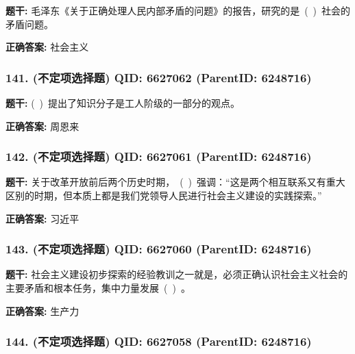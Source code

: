 \documentclass[12pt,UTF8]{ctexart}
\begin{document}
\textbf{题干:}
毛泽东《关于正确处理人民内部矛盾的问题》的报告，研究的是 ( ) 社会的矛盾问题。



\textbf{正确答案:}
社会主义

\vspace{0.3em}\hrulefill\vspace{0.7em}

\subsubsection*{141. (不定项选择题) \small QID: 6627062 (ParentID: 6248716)}

\textbf{题干:}
( ) 提出了知识分子是工人阶级的一部分的观点。



\textbf{正确答案:}
周恩来

\vspace{0.3em}\hrulefill\vspace{0.7em}

\subsubsection*{142. (不定项选择题) \small QID: 6627061 (ParentID: 6248716)}

\textbf{题干:}
关于改革开放前后两个历史时期， ( ) 强调：“这是两个相互联系又有重大区别的时期，但本质上都是我们党领导人民进行社会主义建设的实践探索。”



\textbf{正确答案:}
习近平

\vspace{0.3em}\hrulefill\vspace{0.7em}

\subsubsection*{143. (不定项选择题) \small QID: 6627060 (ParentID: 6248716)}

\textbf{题干:}
社会主义建设初步探索的经验教训之一就是，必须正确认识社会主义社会的主要矛盾和根本任务，集中力量发展 ( ) 。



\textbf{正确答案:}
生产力

\vspace{0.3em}\hrulefill\vspace{0.7em}

\subsubsection*{144. (不定项选择题) \small QID: 6627058 (ParentID: 6248716)}
\end{document}
